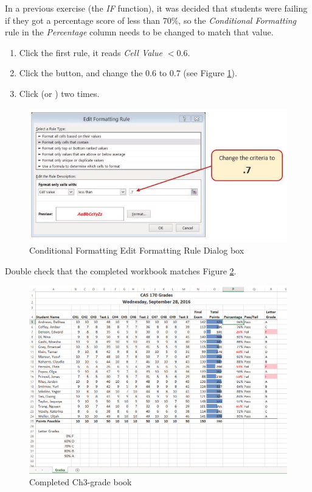 In a previous exercise (the \textit{IF} function), it was decided that students were failing if they got a percentage score of less than $ 70\% $, so the \textit{Conditional Formatting} rule in the \textit{Percentage} column needs to be changed to match that value.

\begin{enumerate}[resume]
	\item Click the first rule, it reads \textit{Cell Value $ <0.6 $}.
	\item Click the  button, and change the $ 0.6 $ to $ 0.7 $ (see Figure \ref{03:fig24}).
	\item Click  (or ) two times.
\end{enumerate}

\begin{figure}[H]
	\centering
	\includegraphics[width=\maxwidth{.95\linewidth}]{gfx/ch03_fig24}
	\caption{Conditional Formatting Edit Formatting Rule Dialog box}
	\label{03:fig24}
\end{figure}

Double check that the completed workbook matches Figure \ref{03:fig25}.

\begin{figure}[H]
	\centering
	\includegraphics[width=\maxwidth{.95\linewidth}]{gfx/ch03_fig25}
	\caption{Completed Ch3-grade book}
	\label{03:fig25}
\end{figure}

